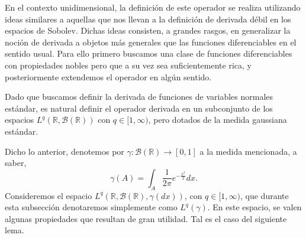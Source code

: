 \documentclass[letterpaper,twoside,12pt]{book}
\newcommand{\R}{\mathbb{R}}
\newcommand{\B}{\mathcal{B}}
\newcommand{\1}{\mathds{1}}
\renewcommand{\to}{\rightarrow}
\theoremstyle{definition}
\theoremstyle{definition}
\theoremstyle{remark}
\theoremstyle{definition}
\theoremstyle{definition}
\theoremstyle{definition}
\theoremstyle{definition}
\theoremstyle{definition}
\begin{document}
En el contexto unidimensional, la definición de este operador se realiza utilizando ideas similares a aquellas que nos llevan a la definición de derivada débil en los espacios de Sobolev. Dichas ideas consisten, a grandes rasgos, en generalizar la noción de derivada a objetos más generales que las funciones diferenciables en el sentido usual. Para ello primero buscamos una clase de funciones diferenciables con propiedades nobles pero que a su vez sea suficientemente rica, y posteriormente extendemos el operador en algún sentido.

Dado que buscamos definir la derivada de funciones de variables normales estándar, es natural definir el operador derivada en un subconjunto de los espacios $L^q(\R,\B(\R))$ con $q\in [1,\infty)$, pero dotados de la medida gaussiana estándar. 

Dicho lo anterior, denotemos por $\gamma:\B(\R)\to [0,1]$ a la medida mencionada, a saber, 
\[
\gamma(A)=\int_A\frac{1}{2\pi}e^{-\frac{x^2}{2}}dx.    
\]
Consideremos el espacio $L^{q}(\R,\B(\R),\gamma(dx))$, con $q\in [1,\infty)$, que durante esta subsección denotaremos simplemente como $L^{q}(\gamma)$. En este espacio, se valen algunas propiedades que resultan de gran utilidad. Tal es el caso del siguiente lema.
\end{document}
